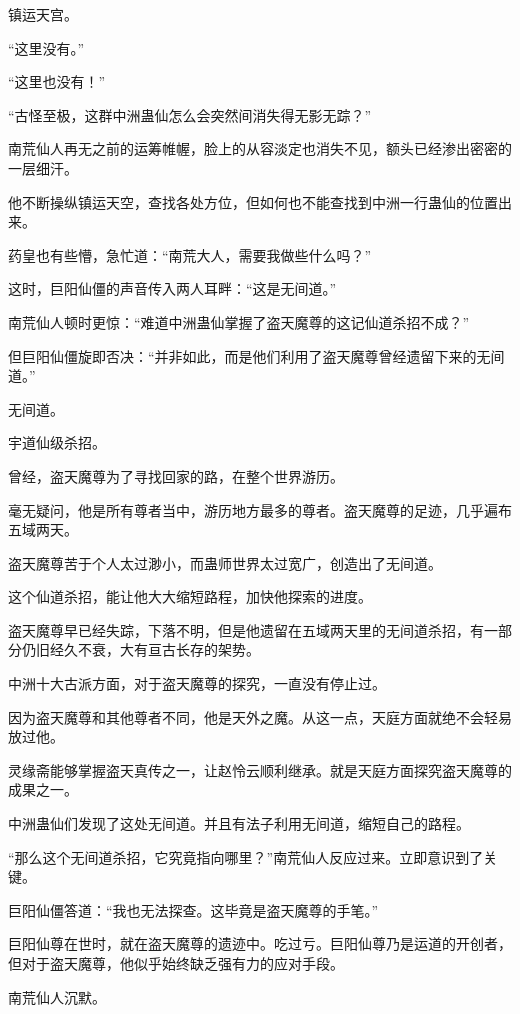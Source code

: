 
\begin{this_body}

镇运天宫。

“这里没有。”

“这里也没有！”

“古怪至极，这群中洲蛊仙怎么会突然间消失得无影无踪？”

南荒仙人再无之前的运筹帷幄，脸上的从容淡定也消失不见，额头已经渗出密密的一层细汗。

他不断操纵镇运天空，查找各处方位，但如何也不能查找到中洲一行蛊仙的位置出来。

药皇也有些懵，急忙道：“南荒大人，需要我做些什么吗？”

这时，巨阳仙僵的声音传入两人耳畔：“这是无间道。”

南荒仙人顿时更惊：“难道中洲蛊仙掌握了盗天魔尊的这记仙道杀招不成？”

但巨阳仙僵旋即否决：“并非如此，而是他们利用了盗天魔尊曾经遗留下来的无间道。”

无间道。

宇道仙级杀招。

曾经，盗天魔尊为了寻找回家的路，在整个世界游历。

毫无疑问，他是所有尊者当中，游历地方最多的尊者。盗天魔尊的足迹，几乎遍布五域两天。

盗天魔尊苦于个人太过渺小，而蛊师世界太过宽广，创造出了无间道。

这个仙道杀招，能让他大大缩短路程，加快他探索的进度。

盗天魔尊早已经失踪，下落不明，但是他遗留在五域两天里的无间道杀招，有一部分仍旧经久不衰，大有亘古长存的架势。

中洲十大古派方面，对于盗天魔尊的探究，一直没有停止过。

因为盗天魔尊和其他尊者不同，他是天外之魔。从这一点，天庭方面就绝不会轻易放过他。

灵缘斋能够掌握盗天真传之一，让赵怜云顺利继承。就是天庭方面探究盗天魔尊的成果之一。

中洲蛊仙们发现了这处无间道。并且有法子利用无间道，缩短自己的路程。

“那么这个无间道杀招，它究竟指向哪里？”南荒仙人反应过来。立即意识到了关键。

巨阳仙僵答道：“我也无法探查。这毕竟是盗天魔尊的手笔。”

巨阳仙尊在世时，就在盗天魔尊的遗迹中。吃过亏。巨阳仙尊乃是运道的开创者，但对于盗天魔尊，他似乎始终缺乏强有力的应对手段。

南荒仙人沉默。


\end{this_body}
